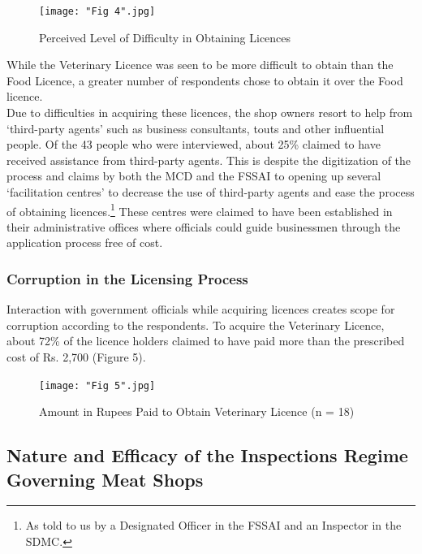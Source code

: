 \documentclass[a4paper, 12pt]{article}
\begin{document}
\begin{figure}[H]
\centering
\texttt{[image: "Fig 4".jpg]}
\caption[Perceived Level of Difficulty in Obtaining Licences] {Perceived Level of Difficulty in Obtaining Licences \footnotemark}
\end{figure} 

While the Veterinary Licence was seen to be more difficult to obtain than the Food Licence, a greater number of respondents chose to obtain it over the Food licence. \\

Due to difficulties in acquiring these licences, the shop owners resort to help from ‘third-party agents’ such as business consultants, touts and other influential people. Of the 43 people who were interviewed, about 25\% claimed to have received assistance from third-party agents. This is despite the digitization of the process and claims by both the MCD and the FSSAI to opening up several ‘facilitation centres’ to decrease the use of third-party agents and ease the process of obtaining licences.\footnote{ As told to us by a Designated Officer in the FSSAI and an Inspector in the SDMC.} These centres were claimed to have been established in their administrative offices where officials could guide businessmen through the application process free of cost. \\

\subsubsection{Corruption in the Licensing Process}

Interaction with government officials while acquiring licences creates scope for corruption according to the respondents. To acquire the Veterinary Licence, about 72\% of the licence holders claimed to have paid more than the prescribed cost of Rs. 2,700 (Figure 5).\\

\begin{figure}[H]
\centering
\texttt{[image: "Fig 5".jpg]}
\caption[Optional Caption]{Amount in Rupees Paid to Obtain Veterinary Licence (n = 18)}
\end{figure} 

\subsection{Nature and Efficacy of the Inspections Regime Governing Meat Shops}
\end{document}
